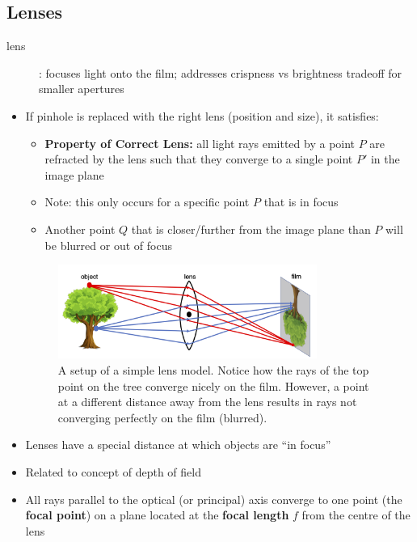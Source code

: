 \documentclass[letterpaper,12pt]{article}
\begin{document}
\subsection{Lenses}
\begin{description}
 \item[lens]: focuses light onto the film; addresses crispness vs brightness tradeoff for smaller apertures
\end{description}
\begin{itemize}
 \item If pinhole is replaced with the right lens (position and size), it satisfies:
       \begin{itemize}
        \item \textbf{Property of Correct Lens:} all light rays emitted by a point $P$ are refracted by the lens such that they converge to a single point $P'$ in the image plane
        \item Note: this only occurs for a specific point $P$ that is in focus
        \item Another point $Q$ that is closer/further from the image plane than $P$ will be blurred or out of focus
       \end{itemize}
       \begin{figure}[h!]
        \centering
        \includegraphics[width=0.8\textwidth]{images/lens.png}
        \caption{A setup of a simple lens model. Notice how the rays of the top point on the tree converge nicely on the film. However, a point at a different distance away from the lens results in rays not converging perfectly on the film (blurred).}
       \end{figure}
 \item Lenses have a special distance at which objects are ``in focus''
 \item Related to concept of depth of field
 \item All rays parallel to the optical (or principal) axis converge to one point (the \textbf{focal point}) on a plane located at the \textbf{focal length} $f$ from the centre of the lens
       \begin{itemize}

\end{itemize}
\end{itemize}
\end{document}
